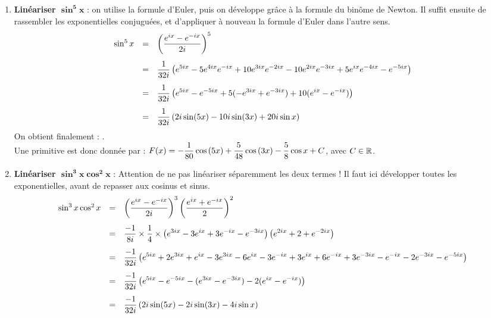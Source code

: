 \documentclass[a4paper, 11pt]{article}
\begin{document}
\begin{correction}   \;
\begin{enumerate}
\item \textbf{Lin\'eariser $\mathbf{\sin^5{x}}$} : on utilise la formule d'Euler, puis on d\'eveloppe gr\^ace \`a la formule du bin\^ome de Newton. Il suffit ensuite de rassembler les exponentielles conjugu\'ees, et d'appliquer \`a nouveau la formule d'Euler dans l'autre sens.
$$\begin{array}{rcl}
\sin^5 x & = & \ddp \left( \frac{e^{ix} - e^{-i x}}{2i} \right)^5\vsec\\
& =& \ddp \frac{1}{32 i} \left( e^{5ix} - 5 e^{4ix}e^{-ix} + 10 e^{3ix} e^{-2ix} - 10 e^{2ix}e^{-3ix} + 5 e^{ix}e^{-4ix} - e^{-5ix}\right)\vsec\\
& =& \ddp \frac{1}{32 i} \left( e^{5ix} - e^{-5ix} + 5 (-e^{3ix} + e^{-3ix}) + 10 (e^{ix} - e^{-ix} ) \right)\vsec\\
& = & \ddp \frac{1}{32 i} \left( 2i \sin(5x) - 10i \sin(3x) + 20 i\sin x\right) 
\end{array}$$
On obtient finalement : .\\
Une primitive est donc donn\'ee par : $F(x) = -\ddp\frac{1}{80}\cos{(5x)}+\ddp\frac{5}{48}\cos{(3x)}-\ddp\frac{5}{8}\cos{x}+C$, avec $C \in \R$.
\item \textbf{Lin\'eariser $\mathbf{\sin^3{x}\cos^2{x}}$} : Attention de ne pas lin\'eariser s\'eparemment les deux termes ! Il faut ici d\'evelopper toutes les exponentielles, avant de repasser aux cosinus et sinus.
$$\begin{array}{rcl}
\sin^3{x}\cos^2{x} & = &\ddp \left( \frac{e^{ix}-e^{-ix}}{2i}\right)^3 \left( \frac{e^{ix}+e^{-ix}}{2}\right)^2\vsec\\
& = & \ddp \frac{-1}{8i} \times \frac{1}{4} \times \left(e^{3ix} - 3 e^{ix} + 3 e^{-ix} - e^{-3ix}\right) \left(e^{2ix} + 2 + e^{-2ix}\right)\vsec\\
& = & \ddp \frac{-1}{32i} \left(e^{5ix} + 2e^{3ix} + e^{ix} - 3e^{3ix} - 6 e^{ix} - 3 e^{-ix} + 3 e^{ix} + 6 e^{-ix} + 3 e^{-3ix} - e^{-ix} - 2 e^{-3ix} - e^{-5ix} \right)\vsec\\
& = & \ddp \frac{-1}{32i} \left(e^{5ix} - e^{-5ix} - (e^{3ix} - e^{-3ix}) - 2 (e^{ix} - e^{-ix})\right)\vsec\\
& = & \ddp \frac{-1}{32i} \left(2i \sin (5x) - 2i \sin(3x) - 4i \sin x\right)

\end{array}$$
\end{enumerate}
\end{correction}
\end{document}
